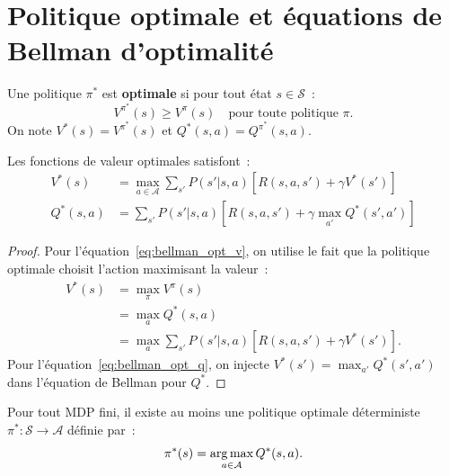 \section{Politique optimale et \'equations de Bellman d'optimalit\'e}

\begin{definition}
Une politique $\pi^*$ est \textbf{optimale} si pour tout \'etat $s \in \mathcal{S}$~:
\[
    V^{\pi^*}(s) \geq V^\pi(s) \quad \text{pour toute politique } \pi.
\]
On note $V^*(s) = V^{\pi^*}(s)$ et $Q^*(s,a) = Q^{\pi^*}(s,a)$.
\end{definition}

\begin{theoreme}
Les fonctions de valeur optimales satisfont~:
\begin{align}
    V^*(s) &= \max_{a \in \mathcal{A}} \sum_{s'} P(s'|s,a)
    \left[ R(s,a,s') + \gamma V^*(s') \right] \label{eq:bellman_opt_v} \\
    Q^*(s,a) &= \sum_{s'} P(s'|s,a)
    \left[ R(s,a,s') + \gamma \max_{a'} Q^*(s',a') \right] \label{eq:bellman_opt_q}
\end{align}
\end{theoreme}

\begin{proof}
Pour l'\'equation~\eqref{eq:bellman_opt_v}, on utilise le fait que la politique
optimale choisit l'action maximisant la valeur~:
\begin{align*}
    V^*(s) &= \max_\pi V^\pi(s) \\
    &= \max_a Q^*(s,a) \\
    &= \max_a \sum_{s'} P(s'|s,a)[R(s,a,s') + \gamma V^*(s')].
\end{align*}
Pour l'\'equation~\eqref{eq:bellman_opt_q}, on injecte $V^*(s') = \max_{a'} Q^*(s',a')$
dans l'\'equation de Bellman pour $Q^*$.
\end{proof}

\begin{theoreme}
\label{thm:existence_opt}
Pour tout MDP fini, il existe au moins une politique optimale d\'eterministe
$\pi^* : \mathcal{S} \to \mathcal{A}$ d\'efinie par~:
\[
    \pi^*(s) = \operatorname*{arg\,max}_{a \in \mathcal{A}} Q^*(s, a).
\]
\end{theoreme}

